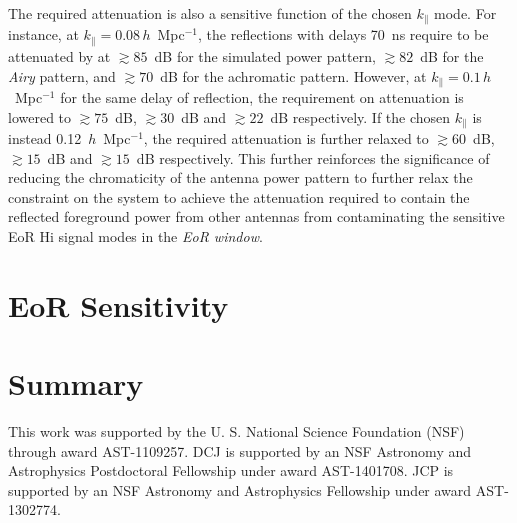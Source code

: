 \documentclass[preprint2,iop,numberedappendix,twocolappendix,appendixfloats]{emulateapj}
\begin{document}
The required attenuation is also a sensitive function of the chosen $k_\parallel$ mode. For instance, at $k_\parallel=0.08\,h$~Mpc$^{-1}$, the reflections with delays 70~ns require to be attenuated by at $\gtrsim 85$~dB for the simulated power pattern, $\gtrsim 82$~dB for the {\it Airy} pattern, and $\gtrsim 70$~dB for the achromatic pattern. However, at $k_\parallel=0.1\,h$~Mpc$^{-1}$ for the same delay of reflection, the requirement on attenuation is lowered to $\gtrsim 75$~dB, $\gtrsim 30$~dB and $\gtrsim 22$~dB respectively. If the chosen $k_\parallel$ is instead 0.12~$h$~Mpc$^{-1}$, the required attenuation is further relaxed to $\gtrsim 60$~dB, $\gtrsim 15$~dB and $\gtrsim 15$~dB respectively. This further reinforces the significance of reducing the chromaticity of the antenna power pattern to further relax the constraint on the system to achieve the attenuation required to contain the reflected foreground power from other antennas from contaminating the sensitive EoR H{\sc i} signal modes in the {\it EoR window}.

\section{EoR Sensitivity}\label{sec:eor-sensitivity}

\section{Summary}\label{sec:summary}

\acknowledgments

This work was supported by the U. S. National Science Foundation (NSF) through award AST-1109257. DCJ is supported by an NSF Astronomy and Astrophysics Postdoctoral Fellowship under award AST-1401708. JCP is supported by an NSF Astronomy and Astrophysics Fellowship under award AST-1302774. 




\end{document}
